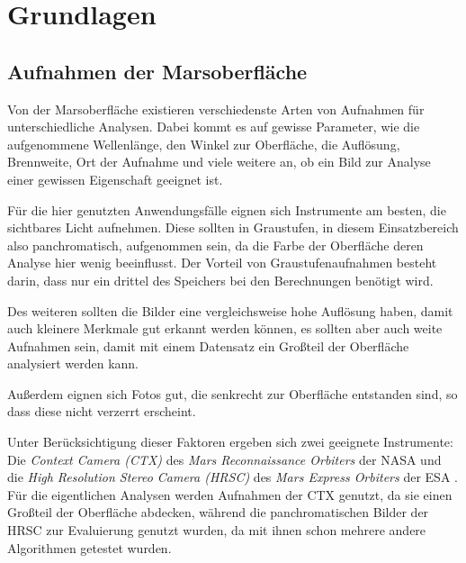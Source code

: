\chapter{Grundlagen}
\label{chap:grundlagen}


\section{Aufnahmen der Marsoberfläche}
\label{sec:mars_images}

Von der Marsoberfläche existieren verschiedenste Arten von Aufnahmen für unterschiedliche Analysen. Dabei kommt es auf gewisse Parameter, wie \zB die aufgenommene Wellenlänge, den Winkel zur Oberfläche, die Auflösung, Brennweite, Ort der Aufnahme und viele weitere an, ob ein Bild zur Analyse einer gewissen Eigenschaft geeignet ist.

Für die hier genutzten Anwendungsfälle eignen sich Instrumente am besten, die sichtbares Licht aufnehmen. Diese sollten in Graustufen, in diesem Einsatzbereich also panchromatisch, aufgenommen sein, da die Farbe der Oberfläche deren Analyse hier wenig beeinflusst. Der Vorteil von Graustufenaufnahmen besteht darin, dass nur ein drittel des Speichers bei den Berechnungen benötigt wird.

Des weiteren sollten die Bilder eine vergleichsweise hohe Auflösung haben, damit auch kleinere Merkmale gut erkannt werden können, es sollten aber auch weite Aufnahmen sein, damit mit einem Datensatz ein Großteil der Oberfläche analysiert werden kann.

Außerdem eignen sich Fotos gut, die senkrecht zur Oberfläche entstanden sind, so dass diese nicht verzerrt erscheint.

Unter Berücksichtigung dieser Faktoren ergeben sich \ua zwei geeignete Instrumente:
Die \textit{Context Camera (CTX)} des \textit{Mars Reconnaissance Orbiters} der NASA \cite{malin_07} und die \textit{High Resolution Stereo Camera (HRSC)} des \textit{Mars Express Orbiters} der ESA \cite{hrsc}. Für die eigentlichen Analysen werden Aufnahmen der CTX genutzt, da sie einen Großteil der Oberfläche abdecken, während die panchromatischen Bilder der HRSC zur Evaluierung genutzt wurden, da mit ihnen schon mehrere andere Algorithmen getestet wurden.


